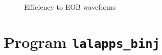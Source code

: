 \documentclass{article}
\newcommand{\prog}[1]{\texttt{#1}}
\begin{document}
\begin{figure}
\begin{center}
\caption{Efficiency to EOB waveforms}
\label{fig:eobeff}
\end{center}
\end{figure}


\section{Program \prog{lalapps\_binj}}
\label{program:lalapps-binj}
\end{document}
